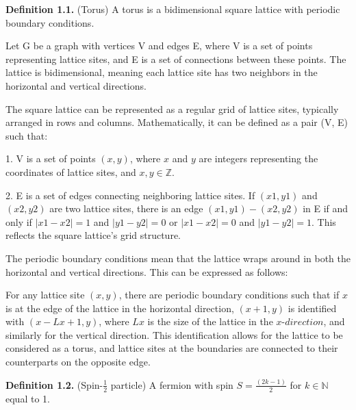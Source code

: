 \documentclass[12pt]{report}
\begin{document}
	
	\begin{minipage}{1\textwidth}
		
		\textbf{Definition 1.1.} (Torus) A torus is a bidimensional square lattice with periodic boundary conditions.\newline 
		
		Let G be a graph with vertices V and edges E, where V is a set of points representing lattice sites, and E is a set of connections between these points. The lattice is bidimensional, meaning each lattice site has two neighbors in the horizontal and vertical directions.\newline
		
		The square lattice can be represented as a regular grid of lattice sites, typically arranged in rows and columns. Mathematically, it can be defined as a pair (V, E) such that:\newline
		
		1. V is a set of points $(x, y)$, where $x$ and $y$ are integers representing the coordinates of lattice sites, and $x, y \in \mathbb{Z} $.\newline
		
		2. E is a set of edges connecting neighboring lattice sites. If $(x1, y1)$ and $(x2, y2)$ are two lattice sites, there is an edge $(x1, y1) - (x2, y2)$ in E if and only if $|x1 - x2| = 1$ and $|y1 - y2| = 0$ or $|x1 - x2| = 0$ and $|y1 - y2| = 1$. This reflects the square lattice's grid structure.\newline
		
		The periodic boundary conditions mean that the lattice wraps around in both the horizontal and vertical directions. This can be expressed as follows:\newline
		
		For any lattice site $(x, y)$, there are periodic boundary conditions such that if $x$ is at the edge of the lattice in the horizontal direction, $(x + 1, y)$ is identified with $(x - Lx + 1, y)$, where $Lx$ is the size of the lattice in the $x$-$direction$, and similarly for the vertical direction. This identification allows for the lattice to be considered as a torus, and lattice sites at the boundaries are connected to their counterparts on the opposite edge.\newline
		
		
		\textbf{Definition 1.2.} (Spin-$\frac{1}{2}$ particle) A fermion with spin $S=\frac{(2k-1)}{2}$ for $k \in \mathbb{N}$ equal to 1.\newline
		

\end{minipage}
\end{document}
